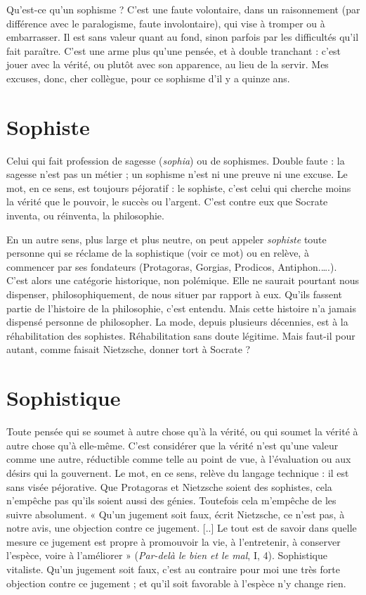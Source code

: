 Qu'est-ce qu’un sophisme ? C’est une faute volontaire, dans un raisonnement
(par différence avec le paralogisme, faute involontaire), qui vise à
tromper ou à embarrasser. Il est sans valeur quant au fond, sinon parfois par
les difficultés qu’il fait paraître. C’est une arme plus qu’une pensée, et à
double tranchant : c’est jouer avec la vérité, ou plutôt avec son apparence, au
lieu de la servir. Mes excuses, donc, cher collègue, pour ce sophisme d'il y a
quinze ans.

\section{Sophiste}
Celui qui fait profession de sagesse ({\it sophia}) ou de sophismes.
Double faute : la sagesse n’est pas un métier ; un sophisme n’est
ni une preuve ni une excuse. Le mot, en ce sens, est toujours péjoratif : le
sophiste, c’est celui qui cherche moins la vérité que le pouvoir, le succès ou
l'argent. C’est contre eux que Socrate inventa, ou réinventa, la philosophie.

En un autre sens, plus large et plus neutre, on peut appeler {\it sophiste} toute
personne qui se réclame de la sophistique (voir ce mot) ou en relève, à commencer
par ses fondateurs (Protagoras, Gorgias, Prodicos, Antiphon.….).
C’est alors une catégorie historique, non polémique. Elle ne saurait pourtant
nous dispenser, philosophiquement, de nous situer par rapport à eux. Qu'ils
fassent partie de l’histoire de la philosophie, c’est entendu. Mais cette histoire
n’a jamais dispensé personne de philosopher. La mode, depuis plusieurs
décennies, est à la réhabilitation des sophistes. Réhabilitation sans doute
légitime. Mais faut-il pour autant, comme faisait Nietzsche, donner tort à
Socrate ?

\section{Sophistique}
Toute pensée qui se soumet à autre chose qu’à la vérité, ou
qui soumet la vérité à autre chose qu’à elle-même. C'est
considérer que la vérité n’est qu’une valeur comme une autre, réductible
comme telle au point de vue, à l'évaluation ou aux désirs qui la gouvernent. Le
mot, en ce sens, relève du langage technique : il est sans visée péjorative. Que
Protagoras et Nietzsche soient des sophistes, cela n’empêche pas qu'ils soient
aussi des génies. Toutefois cela m’empêche de les suivre absolument. « Qu'un
jugement soit faux, écrit Nietzsche, ce n’est pas, à notre avis, une objection
contre ce jugement. [..] Le tout est de savoir dans quelle mesure ce jugement
est propre à promouvoir la vie, à l’entretenir, à conserver l'espèce, voire à
l'améliorer » ({\it Par-delà le bien et le mal}, I, 4). Sophistique vitaliste. Qu’un jugement
soit faux, c’est au contraire pour moi une très forte objection contre ce
jugement ; et qu’il soit favorable à l’espèce n’y change rien.

